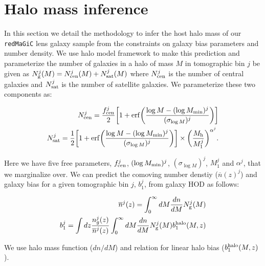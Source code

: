 \documentclass[fleqn,usenatbib]{mnras}
\newcommand{\redmagic}{\texttt{redMaGiC} }
\begin{document}
\section{Halo mass inference}
\label{app:halo_mass}
In this section we detail the methodology to infer the host halo mass of our \redmagic lens galaxy sample from the constraints on galaxy bias parameters and number density. We use halo model framework to make this prediction and parameterize the number of galaxies in a halo of mass $M$ in tomographic bin $j$ be given as $N^{j}_{\rm g}(M) = N^{j}_{\rm{cen}}(M) + N^{j}_{\rm{sat}}(M)$ where $N^{j}_{\rm{cen}}$ is the number of central galaxies and $N^{j}_{\rm{sat}}$ is the number of satellite galaxies. We parameterize these two components as:
\begin{linenomath*}
\begin{align}
    N^{j}_{\rm cen} =  \frac{f^{j}_{\rm cen}}{2} \bigg[1 + {\rm erf}\bigg(\frac{ \log{M} - (\log{M_{\rm min}})^j}{(\sigma_{\log{M}})^j} \bigg) \bigg]  \\
    N^j_{\rm sat} = \frac{1}{2} \bigg[1 + {\rm erf}\bigg(\frac{ \log{M} - (\log{M_{\rm min}})^j}{(\sigma_{\log{M}})^j} \bigg) \bigg] \times \bigg( \frac{M_{\rm h}}{M^j_1} \bigg)^{\alpha^j}.
\end{align}
\end{linenomath*}
Here we have five free parameters, $f^j_{\rm cen}$, $(\log{M_{\rm min}})^j$, $(\sigma_{\log{M}})^j$, $M^j_1$ and $\alpha^j$, that we marginalize over. We can predict the comoving number denstiy ($\overline{n}(z)^j$) and galaxy bias for a given tomographic bin $j$, $b^j_1$, from galaxy HOD as follows:

\begin{linenomath*}
\begin{align}\label{eq:nbar_b1b2}
\nonumber    \overline{n}^j(z) = \int_{0}^{\infty} dM \frac{dn}{dM} N^{j}_{\rm g}(M) \\
\nonumber    b^{j}_1 = \int dz \frac{n^j_g(z)}{\overline{n}^j(z)} \int_{0}^{\infty} dM \frac{dn}{dM} N^{j}_{\rm g}(M) b^{\rm halo}_{1}(M,z)\\
\end{align}
\end{linenomath*}
We use \cite{Tinker_2008} halo mass function ($dn/dM$) and \cite{Tinker_2010} relation for linear halo bias ($b^{\rm halo}_{1}(M,z)$). 
\end{document}

